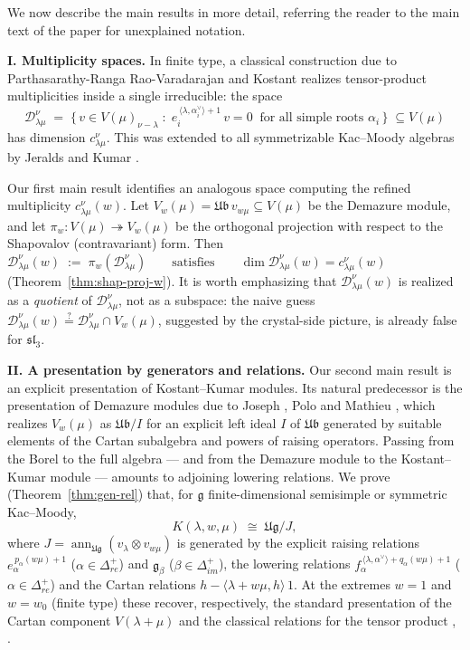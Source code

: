 \documentclass[12pt,reqno]{amsart}
\theoremstyle{plain}
\theoremstyle{definition}
\theoremstyle{remark}
\theoremstyle{plain}
\newcommand{\mcdw}{\mathcal{D}_{\!\lambda\mu}^{\nu}(w)}
\newcommand{\mcd}{\mathcal{D}_{\!\lambda\mu}^{\nu}}
\newcommand{\posreal}[1][+]{\Delta_{re}^{#1}}
\newcommand{\posimag}{\Delta_{im}^+}
\newcommand{\lie}{\mathfrak}
\newcommand{\lrw}{c_{\lambda\mu}^\nu(w)}
\newcommand{\lr}{c_{\lambda\mu}^\nu}
\DeclareMathOperator{\ann}{ann}
\begin{document}
We now describe the main results in more detail, referring the reader to the main text of the paper for unexplained notation.

\medskip
\noindent\textbf{I. Multiplicity spaces.}
In finite type, a classical construction due to Parthasarathy-Ranga Rao-Varadarajan and Kostant realizes tensor-product multiplicities inside a single
irreducible: the space
\[
    \mcd \;=\; \bigl\{\,v\in V(\mu)_{\nu-\lambda}\;:\;
    e_i^{\,\langle\lambda,\alpha_i^\vee\rangle+1}\,v=0\ \text{ for all simple roots } \alpha_i\,\bigr\} \;\subseteq V(\mu)
\]
has dimension $\lr$. This was extended to all symmetrizable Kac--Moody algebras
by Jeralds and Kumar \cite{jeralds-kumar}.


Our first main result identifies an analogous space computing the refined
multiplicity $\lrw$. Let $V_w(\mu)=\lie{Ub}\,v_{w\mu}\subseteq V(\mu)$ be the
Demazure module, and let $\pi_w\colon V(\mu)\twoheadrightarrow V_w(\mu)$ be
the orthogonal projection with respect to the Shapovalov (contravariant)
form. Then
$
    \mcdw \;:=\; \pi_w(\mcd)
    \qquad\text{satisfies}\qquad
    \dim\mcdw=\lrw
$ 
(Theorem~\ref{thm:shap-proj-w}). It is worth emphasizing that $\mcdw$ is
realized as a \emph{quotient} of $\mcd$, not as a subspace: the naive
guess $\mcdw\stackrel{?}{=}\mcd\cap V_w(\mu)$, suggested by the crystal-side
picture, is already false for $\mathfrak{sl}_3$. 

\medskip
\noindent\textbf{II. A presentation by generators and relations.}
Our second main result is an explicit presentation of Kostant--Kumar
modules. Its natural predecessor is the presentation of Demazure modules
due to Joseph \cite{J1}, Polo \cite{P1} and Mathieu \cite{M1},
which realizes $V_w(\mu)$ as $\lie{Ub}/I$ for an explicit left ideal $I$ of
$\lie{Ub}$ generated by suitable elements of the Cartan subalgebra and powers of raising operators. Passing from the Borel to the full algebra --- and from the Demazure module to the
Kostant--Kumar module --- amounts to adjoining lowering relations. We prove
(Theorem~\ref{thm:gen-rel}) that, for $\lie g$ finite-dimensional semisimple
or symmetric Kac--Moody,
\[
    K(\lambda,w,\mu)\;\cong\;\lie{Ug}/J,
\]
where $J=\ann_{\lie{Ug}}(v_\lambda\otimes v_{w\mu})$ is generated by the
explicit raising relations $e_\alpha^{\,p_\alpha(w\mu)+1}$
($\alpha\in\posreal$) and ${\lie g}_\beta$ ($\beta\in\posimag$), the lowering relations
$f_\alpha^{\,\langle\lambda,\alpha^\vee\rangle+q_\alpha(w\mu)+1}$
($\alpha\in\posreal$) and the
Cartan relations $h-\langle\lambda+w\mu,h\rangle\,1$. At the extremes $w=1$
and $w=w_0$ (finite type) these recover, respectively, the standard presentation of the
Cartan component $V(\lambda+\mu)$ and the classical
  relations for the tensor product \cite{GE}, \cite{PRV}.
\end{document}
